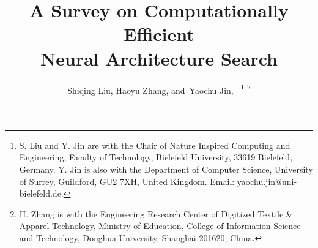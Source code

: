 \documentclass[journal]{IEEEtran}
\begin{document}
%
\title{A Survey on Computationally Efficient\\
       Neural Architecture Search}


%
%
%

\author{Shiqing Liu,
        Haoyu Zhang,
        and~Yaochu Jin,~%
\thanks{S. Liu and Y. Jin are with the Chair of Nature Inspired Computing and Engineering, Faculty of Technology, Bielefeld University, 33619 Bielefeld, Germany. Y. Jin is also with the Department of Computer Science, University of Surrey, Guildford, GU2 7XH, United Kingdom. Email: yaochu.jin@uni-bielefeld.de.}%
\thanks{H. Zhang is with the Engineering Research Center of Digitized Textile \& Apparel Technology, Ministry of Education, College of Information Science and Technology, Donghua University, Shanghai 201620, China.}%
}

% 
%
\end{document}
